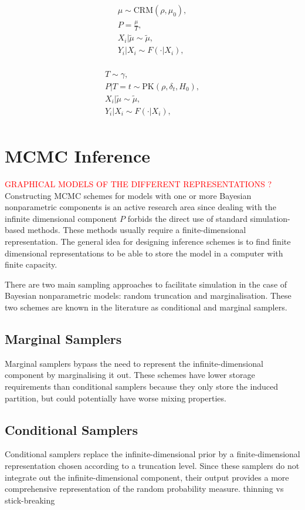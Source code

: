 \begin{gather*}
\mu \sim \text{CRM}(\rho, \mu_0), \\
P = \frac{\mu}{T}, \\
X_i|\tilde{\mu} \sim \tilde{\mu}, \\
Y_i|X_i \sim F(\cdot|X_i), \\
\end{gather*}

\begin{gather*}
T \sim \gamma, \\
P|T=t \sim \text{PK}(\rho, \delta_t, H_0), \\
X_i|\tilde{\mu} \sim \tilde{\mu}, \\
Y_i|X_i \sim F(\cdot|X_i), \\
\end{gather*}

\section{MCMC Inference}
\textcolor{red}{GRAPHICAL MODELS OF THE DIFFERENT REPRESENTATIONS ?}
Constructing MCMC schemes for models with one or more Bayesian nonparametric components is an active research area since dealing with the infinite dimensional component $P$ forbids the direct use of standard simulation-based methods. These methods usually require a finite-dimensional representation. The general idea for designing inference schemes is to find finite dimensional representations to be able to store the model in a computer with finite capacity.

There are two main sampling approaches to facilitate simulation in the case of Bayesian nonparametric models: random truncation and marginalisation. These two schemes are known in the literature as conditional and marginal samplers.

\subsection{Marginal Samplers}
Marginal samplers bypass the need to represent the infinite-dimensional component by marginalising it out. These schemes have lower storage requirements than conditional samplers because they only store the induced partition, but could potentially have worse mixing properties.

\subsection{Conditional Samplers}
Conditional samplers replace the infinite-dimensional prior by a finite-dimensional representation chosen according to a truncation level. Since these samplers do not integrate out the infinite-dimensional component, their output provides a more comprehensive representation of the random probability measure.
thinning vs stick-breaking

